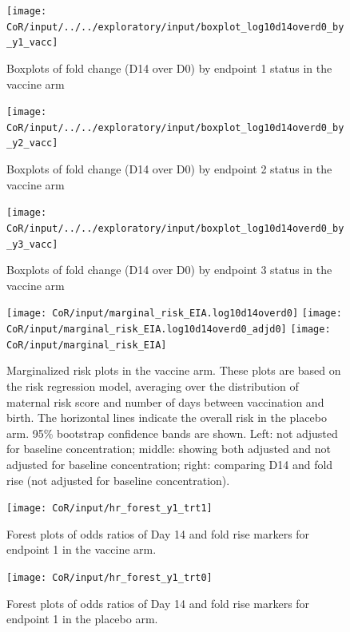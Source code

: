 \documentclass[11pt]{article}
\begin{document}
\begin{figure}[H]
    \centering
    \texttt{[image: CoR/input/../../exploratory/input/boxplot\_log10d14overd0\_by\_y1\_vacc]}
    \caption{Boxplots of fold change (D14 over D0) by endpoint 1 status in the vaccine arm}
    \label{fig:boxplot_log10d14overd0_by_y1_vacc}
\end{figure}

\begin{figure}[H]
    \centering
    \texttt{[image: CoR/input/../../exploratory/input/boxplot\_log10d14overd0\_by\_y2\_vacc]}
    \caption{Boxplots of fold change (D14 over D0) by endpoint 2 status in the vaccine arm}
    \label{fig:boxplot_log10d14overd0_by_y2_vacc}
\end{figure}

\begin{figure}[H]
    \centering
    \texttt{[image: CoR/input/../../exploratory/input/boxplot\_log10d14overd0\_by\_y3\_vacc]}
    \caption{Boxplots of fold change (D14 over D0) by endpoint 3 status in the vaccine arm}
    \label{fig:boxplot_log10d14overd0_by_y3_vacc}
\end{figure}

\clearpage

\begin{figure}[H]
    \centering
    \texttt{[image: CoR/input/marginal\_risk\_EIA.log10d14overd0]}
    \texttt{[image: CoR/input/marginal\_risk\_EIA.log10d14overd0\_adjd0]}
    \texttt{[image: CoR/input/marginal\_risk\_EIA]}
    \caption{Marginalized risk plots in the vaccine arm. These plots are based on the risk regression model, averaging over the distribution of maternal risk score and number of days between vaccination and birth. The horizontal lines indicate the overall risk in the placebo arm. 95\% bootstrap confidence bands are shown. Left: not adjusted for baseline concentration; middle: showing both adjusted and not adjusted for baseline concentration; right: comparing D14 and fold rise (not adjusted for baseline concentration).}
    \label{fig:marginal_risk_EIA.log10d14overd0}
\end{figure}

\clearpage
\begin{figure}[H]
    \centering
    \texttt{[image: CoR/input/hr\_forest\_y1\_trt1]}
    \caption{Forest plots of odds ratios of Day 14 and fold rise markers for endpoint 1 in the vaccine arm.}
    \label{hr_forest_y1_trt1}
\end{figure}
\begin{figure}[H]
    \centering
    \texttt{[image: CoR/input/hr\_forest\_y1\_trt0]}
    \caption{Forest plots of odds ratios of Day 14 and fold rise markers for endpoint 1 in the placebo arm.}
    \label{hr_forest_y1_trt0}
\end{figure}
\clearpage
\end{document}
